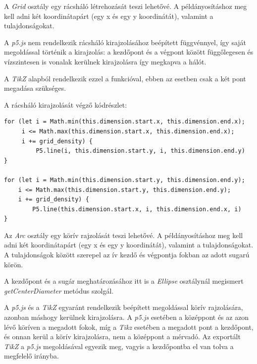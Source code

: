 
A \textit{Grid} osztály egy rácsháló létrehozását teszi lehetővé.  A példányosításhoz meg kell adni két koordinátapárt (egy x és egy y koordinátát), valamint a tulajdonságokat. 

A \textit{p5.js} nem rendelkezik rácsháló kirajzolásához beépített függvénnyel, így saját megoldással történik a kirajzolás: a kezdőpont és a végpont között függőlegesen és vízszintesen is vonalak kerülnek kirajzolásra így megkapva a hálót.

A \textit{TikZ} alapból rendelkezik ezzel a funkcióval, ebben az esetben csak a két pont megadása szükséges.

A rácsháló kirajzolását végző kódrészlet:

\begin{lstlisting}[style=es6, morekeywords={P5}]
for (let i = Math.min(this.dimension.start.x, this.dimension.end.x); 
     i <= Math.max(this.dimension.start.x, this.dimension.end.x); 
     i += grid_density) {
         P5.line(i, this.dimension.start.y, i, this.dimension.end.y)
}

for (let i = Math.min(this.dimension.start.y, this.dimension.end.y); 
    i <= Math.max(this.dimension.start.y, this.dimension.end.y); 
    i += grid_density) {
        P5.line(this.dimension.start.x, i, this.dimension.end.x, i)
}
\end{lstlisting}


Az \textit{Arc} osztály egy körív rajzolását teszi lehetővé. A példányosításhoz meg kell adni két koordinátapárt (egy x és egy y koordinátát), valamint a tulajdonságokat. A tulajdonságok között szerepel az ív kezdő és végpontja fokban az adott sugarú körön.

A kezdőpont és a sugár meghatározásához itt is a \textit{Ellipse} osztálynál megismert \textit{getCenterDiameter} metódus szolgál. 

A \textit{p5.js} és a \textit{TikZ} egyaránt rendelkezik beépített megoldással körív rajzolására, azonban máshogy kerülnek kirajzolásra. A \textit{p5.js} esetében a középpont és az azon lévő köríven a megadott fokok, míg a \textit{Tikz} esetében a megadott pont a kezdőpont, és onnan kerül a körív kirajzolásra, nem a középpont a mérvadó. Az exportált \textit{TikZ} a \textit{p5.js} megoldásával egyezik meg, vagyis a kezdőpontba el van tolva a megfelelő irányba.


